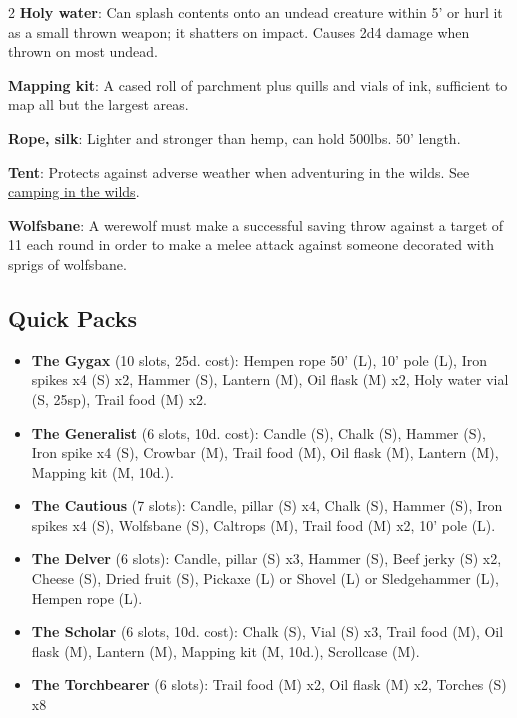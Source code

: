\documentclass{book}
\providecommand{\tightlist}{%
\setlength{\itemsep}{0pt}\setlength{\parskip}{0pt}}
\begin{document}
\begin{multicols}{2}
\textbf{Holy water}: Can splash contents onto an undead creature within
5' or hurl it as a small thrown weapon; it shatters on impact. Causes
2d4 damage when thrown on most undead.

\textbf{Mapping kit}: A cased roll of parchment plus quills and vials of
ink, sufficient to map all but the largest areas.

\textbf{Rope, silk}: Lighter and stronger than hemp, can hold 500lbs.
50' length.

\textbf{Tent}: Protects against adverse weather when adventuring in the
wilds. See \hyperref[camping-in-the-wilds]{camping in the wilds}.

\textbf{Wolfsbane}: A werewolf must make a successful saving throw
against a target of 11 each round in order to make a melee attack
against someone decorated with sprigs of wolfsbane.
\end{multicols}

\subsection*{Quick Packs}\label{quick-packs}

\begin{itemize}
\tightlist
\item
  \textbf{The Gygax} (10 slots, 25d. cost): Hempen rope 50' (L), 10'
  pole (L), Iron spikes x4 (S) x2, Hammer (S), Lantern (M), Oil flask
  (M) x2, Holy water vial (S, 25sp), Trail food (M) x2.
\item
  \textbf{The Generalist} (6 slots, 10d. cost): Candle (S), Chalk (S),
  Hammer (S), Iron spike x4 (S), Crowbar (M), Trail food (M), Oil flask
  (M), Lantern (M), Mapping kit (M, 10d.).
\item
  \textbf{The Cautious} (7 slots): Candle, pillar (S) x4, Chalk (S),
  Hammer (S), Iron spikes x4 (S), Wolfsbane (S), Caltrops (M), Trail
  food (M) x2, 10' pole (L).
\item
  \textbf{The Delver} (6 slots): Candle, pillar (S) x3, Hammer (S), Beef
  jerky (S) x2, Cheese (S), Dried fruit (S), Pickaxe (L) or Shovel (L)
  or Sledgehammer (L), Hempen rope (L).
\item
  \textbf{The Scholar} (6 slots, 10d. cost): Chalk (S), Vial (S) x3,
  Trail food (M), Oil flask (M), Lantern (M), Mapping kit (M, 10d.),
  Scrollcase (M).
\item
  \textbf{The Torchbearer} (6 slots): Trail food (M) x2, Oil flask (M)
  x2, Torches (S) x8
\end{itemize}
\end{document}
